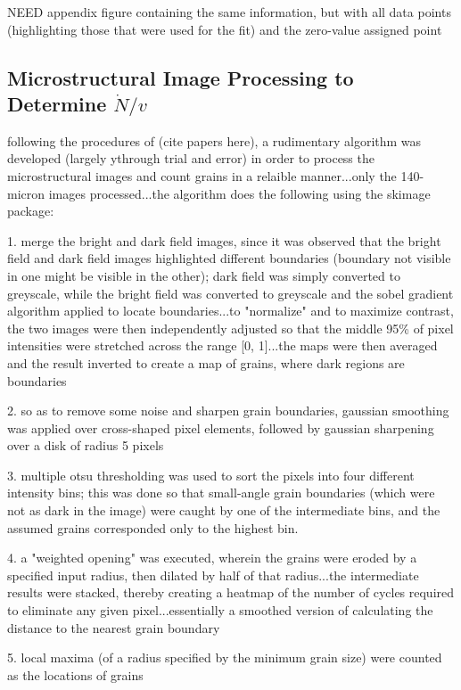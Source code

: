 NEED appendix figure containing the same information, but with all data points (highlighting those that were used for the fit) and the zero-value assigned point

\subsection{Microstructural Image Processing to Determine $\dot{N}/v$}

following the procedures of (cite papers here), a rudimentary algorithm was developed (largely ythrough trial and error) in order to process the microstructural images and count grains in a relaible manner...only the 140-micron images processed...the algorithm does the following using the skimage package:

1. merge the bright and dark field images, since it was observed that the bright field and dark field images highlighted different boundaries (boundary not visible in one might be visible in the other); dark field was simply converted to greyscale, while the bright field was converted to greyscale and the sobel gradient algorithm applied to locate boundaries...to "normalize" and to maximize contrast, the two images were then independently adjusted so that the middle 95\% of pixel intensities were stretched across the range [0, 1]...the maps were then averaged and the result inverted to create a map of grains, where dark regions are boundaries

2. so as to remove some noise and sharpen grain boundaries, gaussian smoothing was applied over cross-shaped pixel elements, followed by gaussian sharpening over a disk of radius 5 pixels

3. multiple otsu thresholding was used to sort the pixels into four different intensity bins; this was done so that small-angle grain boundaries (which were not as dark in the image) were caught by one of the intermediate bins, and the assumed grains corresponded only to the highest bin.

4. a "weighted opening" was executed, wherein the grains were eroded by a specified input radius, then dilated by half of that radius...the intermediate results were stacked, thereby creating a heatmap of the number of cycles required to eliminate any given pixel...essentially a smoothed version of calculating the distance to the nearest grain boundary

5. local maxima (of a radius specified by the minimum grain size) were counted as the locations of grains

